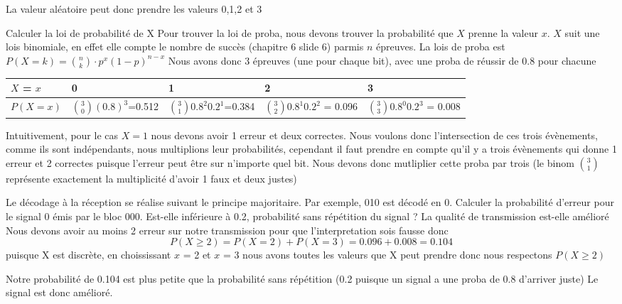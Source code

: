 \begin{exo}
\begin{subexo}
    La valeur aléatoire peut donc prendre les valeurs 0,1,2 et 3
  \end{subexo}
  \begin{subexo}{Calculer la loi de probabilité de X}
    Pour trouver la loi de proba, nous devons trouver la probabilité que $X$ prenne la valeur $x$.
    $X$ suit une lois binomiale, en effet elle compte le nombre de succès (chapitre 6 slide 6) parmis $n$ épreuves. 
    La lois de proba est $P(X=k) = \binom{n}{k} \cdot p^x(1-p)^{n-x} $
    Nous avons donc 3 épreuves (une pour chaque bit), avec une proba de réussir de 0.8 pour chacune
    \begin{center}
      \begin{tabular}{p{2cm}|p{3cm}p{3.5cm}p{3.5cm}p{3.5cm}}        
        $X$ = $x$  & 0 & 1 & 2 & 3 \\ \midrule
        $P(X=x)$ & $\binom{3}{0}(0.8)^3$=0.512 & $\binom{3}{1} 0.8^2  0.2^1$=0.384 & $\binom{3}{2} 0.8^1  0.2^2$ = 0.096& $\binom{3}{3} 0.8^0  0.2^3$ = 0.008 
      \end{tabular}
    \end{center}
    Intuitivement, pour le cas $X=1$ nous devons avoir 1 erreur et deux correctes. Nous voulons donc l'intersection de ces trois évènements, comme ils sont indépendants, nous multiplions leur probabilités, cependant il faut prendre en compte qu'il y a trois évènements qui donne 1 erreur et 2 correctes puisque l'erreur peut être sur n'importe quel bit. Nous devons donc mutliplier cette proba par trois (le binom $\binom{3}{1}$ représente exactement la multiplicité d'avoir 1 faux et deux justes) 
  \end{subexo}
  \begin{subexo}{Le décodage à la réception se réalise suivant le principe majoritaire. Par exemple, 010 est décodé
    en 0. Calculer la probabilité d’erreur pour le signal 0  émis par le bloc 000. Est-elle inférieure à 0.2,
    probabilité sans répétition du signal ? La qualité de transmission est-elle amélioré}
    Nous devons avoir au moins 2 erreur sur notre transmission pour que l'interpretation sois fausse donc  
    $$P(X\ge 2) = P(X=2) + P(X=3)  = 0.096 + 0.008 = 0.104$$
    puisque X est discrète, en choississant $x$ = 2 et $x$ = 3 nous avons toutes les valeurs que X peut prendre 
    donc nous respectons $P(X\ge 2)$

    Notre probabilité de 0.104 est plus petite que la probabilité sans répétition (0.2 puisque un signal a une proba de 0.8 d'arriver juste) Le signal est donc amélioré.
  \end{subexo}
\end{exo}
